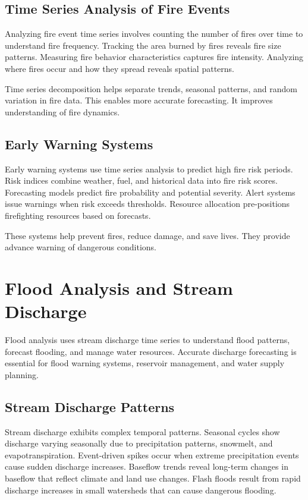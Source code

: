 \subsection{Time Series Analysis of Fire Events}

Analyzing fire event time series involves counting the number of fires over time to understand fire frequency. Tracking the area burned by fires reveals fire size patterns. Measuring fire behavior characteristics captures fire intensity. Analyzing where fires occur and how they spread reveals spatial patterns.

Time series decomposition helps separate trends, seasonal patterns, and random variation in fire data. This enables more accurate forecasting. It improves understanding of fire dynamics.

\subsection{Early Warning Systems}

Early warning systems use time series analysis to predict high fire risk periods. Risk indices combine weather, fuel, and historical data into fire risk scores. Forecasting models predict fire probability and potential severity. Alert systems issue warnings when risk exceeds thresholds. Resource allocation pre-positions firefighting resources based on forecasts.

These systems help prevent fires, reduce damage, and save lives. They provide advance warning of dangerous conditions.

\section{Flood Analysis and Stream Discharge}

Flood analysis uses stream discharge time series to understand flood patterns, forecast flooding, and manage water resources. Accurate discharge forecasting is essential for flood warning systems, reservoir management, and water supply planning.

\subsection{Stream Discharge Patterns}

Stream discharge exhibits complex temporal patterns. Seasonal cycles show discharge varying seasonally due to precipitation patterns, snowmelt, and evapotranspiration. Event-driven spikes occur when extreme precipitation events cause sudden discharge increases. Baseflow trends reveal long-term changes in baseflow that reflect climate and land use changes. Flash floods result from rapid discharge increases in small watersheds that can cause dangerous flooding.

